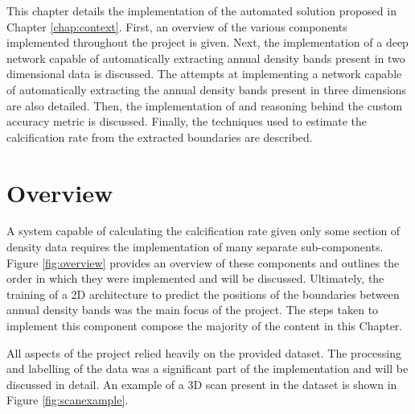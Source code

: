 This chapter details the implementation of the automated solution proposed in Chapter \ref{chap:context}. First, an overview of the various components implemented throughout the project is given. Next, the implementation of a deep network capable of automatically extracting annual density bands present in two dimensional data is discussed. The attempts at implementing a network capable of automatically extracting the annual density bands present in three dimensions are also detailed. Then, the implementation of and reasoning behind the custom accuracy metric is discussed. Finally, the techniques used to estimate the calcification rate from the extracted boundaries are described.

\section{Overview}

A system capable of calculating the calcification rate given only some section of density data requires the implementation of many separate sub-components. Figure \ref{fig:overview} provides an overview of these components and outlines the order in which they were implemented and will be discussed. Ultimately, the training of a 2D architecture to predict the positions of the boundaries between annual density bands was the main focus of the project. The steps taken to implement this component compose the majority of the content in this Chapter.

All aspects of the project relied heavily on the provided dataset. The processing and labelling of the data was a significant part of the implementation and will be discussed in detail. An example of a 3D scan present in the dataset is shown in Figure \ref{fig:scanexample}.

